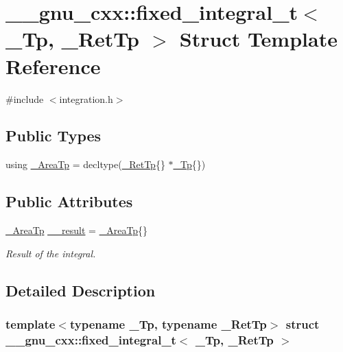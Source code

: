 \hypertarget{struct____gnu__cxx_1_1fixed__integral__t}{}\section{\+\_\+\+\_\+gnu\+\_\+cxx\+:\+:fixed\+\_\+integral\+\_\+t$<$ \+\_\+\+Tp, \+\_\+\+Ret\+Tp $>$ Struct Template Reference}
\label{struct____gnu__cxx_1_1fixed__integral__t}


{\ttfamily \#include $<$integration.\+h$>$}

\subsection*{Public Types}
\begin{DoxyCompactItemize}
\item 
using \hyperlink{struct____gnu__cxx_1_1fixed__integral__t_a68a11ba646968b5cebfc4cc7c1547478}{\+\_\+\+Area\+Tp} = decltype(\hyperlink{namespace____gnu__cxx_a886e03ece3d53ff7fa6c098a40f93fa5}{\+\_\+\+Ret\+Tp}\{\} $\ast$\hyperlink{namespace____gnu__cxx_a3b19a9c800ca194374ef9172290f7d79}{\+\_\+\+Tp}\{\})
\end{DoxyCompactItemize}
\subsection*{Public Attributes}
\begin{DoxyCompactItemize}
\item 
\hyperlink{struct____gnu__cxx_1_1fixed__integral__t_a68a11ba646968b5cebfc4cc7c1547478}{\+\_\+\+Area\+Tp} \hyperlink{struct____gnu__cxx_1_1fixed__integral__t_a9d52eafc8db2db186dee1587be02d7bd}{\+\_\+\+\_\+result} = \hyperlink{struct____gnu__cxx_1_1fixed__integral__t_a68a11ba646968b5cebfc4cc7c1547478}{\+\_\+\+Area\+Tp}\{\}
\begin{DoxyCompactList}\small\item\em Result of the integral. \end{DoxyCompactList}\end{DoxyCompactItemize}


\subsection{Detailed Description}
\subsubsection*{template$<$typename \+\_\+\+Tp, typename \+\_\+\+Ret\+Tp$>$\newline
struct \+\_\+\+\_\+gnu\+\_\+cxx\+::fixed\+\_\+integral\+\_\+t$<$ \+\_\+\+Tp, \+\_\+\+Ret\+Tp $>$}

